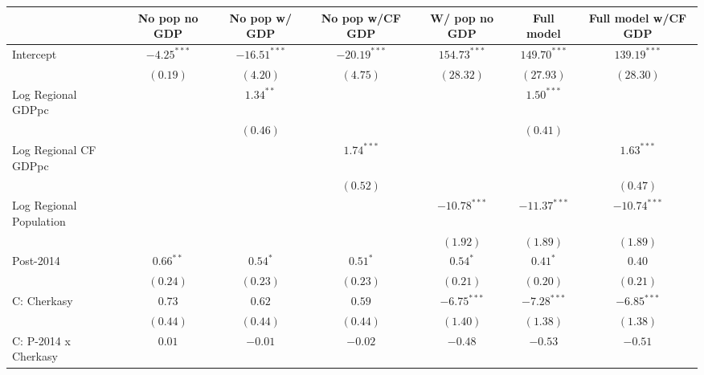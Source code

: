 
\begin{table}
\begin{center}
\begin{small}
\begin{tabular}{l c c c c c c}
\hline
 & No pop
no GDP & No pop
w/ GDP & No pop 
w/CF GDP & W/ pop
no GDP & Full model & Full model w/CF GDP \\
\hline
Intercept                   & $-4.25^{***}$ & $-16.51^{***}$ & $-20.19^{***}$ & $154.73^{***}$ & $149.70^{***}$ & $139.19^{***}$ \\
                            & $(0.19)$      & $(4.20)$       & $(4.75)$       & $(28.32)$      & $(27.93)$      & $(28.30)$      \\
Log Regional GDPpc          &               & $1.34^{**}$    &                &                & $1.50^{***}$   &                \\
                            &               & $(0.46)$       &                &                & $(0.41)$       &                \\
Log Regional CF GDPpc       &               &                & $1.74^{***}$   &                &                & $1.63^{***}$   \\
                            &               &                & $(0.52)$       &                &                & $(0.47)$       \\
Log Regional Population     &               &                &                & $-10.78^{***}$ & $-11.37^{***}$ & $-10.74^{***}$ \\
                            &               &                &                & $(1.92)$       & $(1.89)$       & $(1.89)$       \\
Post-2014                   & $0.66^{**}$   & $0.54^{*}$     & $0.51^{*}$     & $0.54^{*}$     & $0.41^{*}$     & $0.40$         \\
                            & $(0.24)$      & $(0.23)$       & $(0.23)$       & $(0.21)$       & $(0.20)$       & $(0.21)$       \\
C: Cherkasy                 & $0.73$        & $0.62$         & $0.59$         & $-6.75^{***}$  & $-7.28^{***}$  & $-6.85^{***}$  \\
                            & $(0.44)$      & $(0.44)$       & $(0.44)$       & $(1.40)$       & $(1.38)$       & $(1.38)$       \\
C: P-2014 x Cherkasy        & $0.01$        & $-0.01$        & $-0.02$        & $-0.48$        & $-0.53$        & $-0.51$        \\

\end{tabular}
\end{small}
\end{center}
\end{table}
